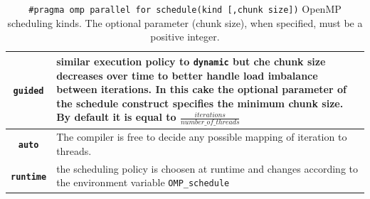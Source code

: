 \begin{description}
\begin{table}
\begin{tabularx}{1.0\textwidth}{cX}
    		\rowcolor{gray!15}
    		\texttt{\textbf{guided}} & similar execution policy  to \texttt{dynamic} but che chunk size decreases over time to better handle load imbalance between iterations. In this cake the optional parameter of the schedule construct specifies the minimum chunk size. By default it is equal to $\frac{iterations}{number\_of\_threads}$\\ \hline
    		
    		\rowcolor{gray!5}
    		\texttt{\textbf{auto}} & The compiler is free to decide any possible mapping of iteration to threads.\\ \hline
    		
    		\rowcolor{gray!15}
    		\texttt{\textbf{runtime}} & the scheduling policy is choosen at runtime and changes according to the environment variable \verb|OMP_schedule| \\ \hline
    	\end{tabularx}
    	\label{tab:scheduling_policies}
    	\caption[OpenMP scheduling policies]{\texttt{\#pragma omp parallel for schedule(kind [,chunk size])} OpenMP scheduling kinds. The optional parameter (chunk size), when specified, must be a positive integer. }
    \end{table}
    

\end{description}
